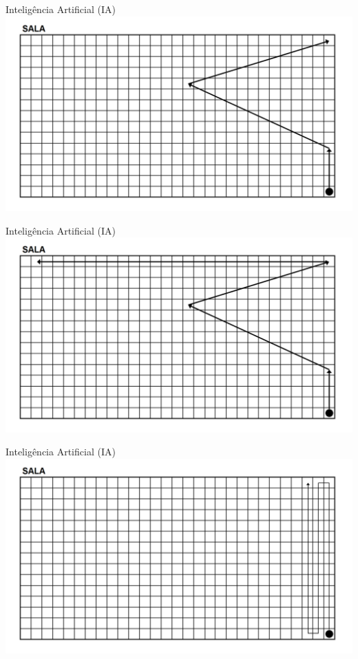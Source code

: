 \documentclass{libs/ufc_format}
\begin{document}
\begin{frame}{Inteligência Artificial (IA)}
    \includegraphics[width=\textwidth]{media/SALA_caminho01_03}
\end{frame}

\begin{frame}{Inteligência Artificial (IA)}
    \includegraphics[width=\textwidth]{media/SALA_caminho01_04}
\end{frame}

\begin{frame}{Inteligência Artificial (IA)}
    \includegraphics[width=\textwidth]{media/SALA_caminho02_01}
\end{frame}
\end{document}
